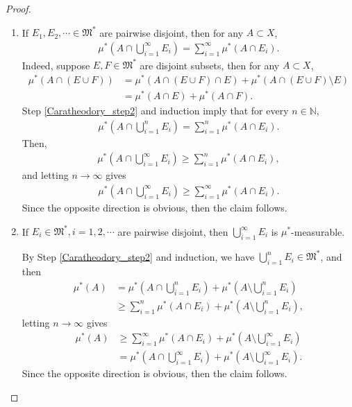 \documentclass[11pt]{book}
\theoremstyle{definition}
\numberwithin{equation}{chapter}
\def\MM{\mathfrak{M}}
\begin{document}
\begin{proof}
\begin{enumerate}[label=(\Roman*)]
    \item If $E_1, E_2, \cdots \in \MM^*$ are pairwise disjoint, then for any $A \subset X$,
    \begin{align*}
        \mu^* \left(A \cap \bigcup^\infty_{i=1} E_i\right) = \sum^\infty_{i=1} \mu^*(A \cap E_i).
    \end{align*}
    Indeed, suppose $E, F \in \MM^*$ are disjoint subsets, then for any $A \subset X$,
    \begin{align*}
        \mu^*(A \cap (E \cup F)) & = \mu^*(A \cap (E \cup F) \cap E) + \mu^*(A \cap (E \cup F) \setminus E) \\
        & = \mu^*(A \cap E) + \mu^*(A \cap F).
    \end{align*}
    Step \ref{Caratheodory_step2} and induction imply that for every $n \in \mathbb{N}$,
    \begin{align*}
        \mu^* \left(A \cap \bigcup^n_{i=1} E_i\right) = \sum^n_{i=1} \mu^*(A \cap E_i).
    \end{align*}
    Then, 
    \begin{align*}
        \mu^* \left(A \cap \bigcup^\infty_{i=1} E_i\right) \geq \sum^n_{i=1} \mu^*(A \cap E_i),
    \end{align*}
    and letting $n \to \infty$ gives
    \begin{align*}
        \mu^* \left(A \cap \bigcup^\infty_{i=1} E_i\right) \geq \sum^\infty_{i=1} \mu^*(A \cap E_i).
    \end{align*}
    Since the opposite direction is obvious, then the claim follows. \label{Caratheodory_step5}
    
    \item If $E_i \in \MM^*, i = 1, 2, \cdots$ are pairwise disjoint, then $\bigcup^\infty_{i=1} E_i$ is $\mu^*$-measurable. 
    
    By Step \ref{Caratheodory_step2} and induction, we have $\bigcup^n_{i=1} E_i \in \MM^*$, and then
    \begin{align*}
        \mu^*(A) & = \mu^*\left( A \cap \bigcup^n_{i=1} E_i\right) + \mu^*\left( A \setminus \bigcup^n_{i=1} E_i\right) \\
        & \geq \sum^n_{i=1} \mu^*(A \cap E_i) + \mu^*\left( A \setminus \bigcup^n_{i=1} E_i\right),
    \end{align*}
    letting $n \to \infty$ gives
    \begin{align*}
        \mu^*(A) & \geq \sum^\infty_{i=1} \mu^*(A \cap E_i) + \mu^*\left( A \setminus \bigcup^\infty_{i=1} E_i\right) \\
        & = \mu^*\left( A \cap \bigcup^\infty_{i=1} E_i\right) + \mu^*\left( A \setminus \bigcup^\infty_{i=1} E_i\right).
    \end{align*}
    Since the opposite direction is obvious, then the claim follows. \label{Caratheodory_step6}
    

\end{enumerate}
\end{proof}
\end{document}
